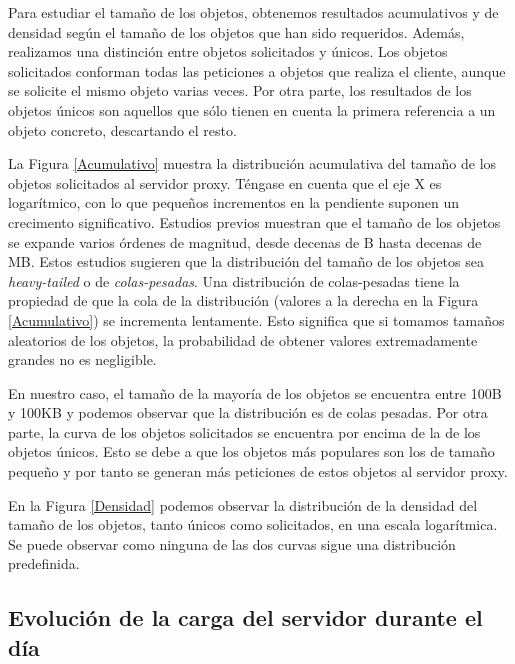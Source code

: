 \documentclass[twocolumn]{Jornadas}
\begin{document}
Para estudiar el tamaño de los objetos, obtenemos resultados acumulativos y de densidad según el tamaño de los objetos que han sido requeridos.
Además, realizamos una distinción entre objetos solicitados y únicos.
Los objetos solicitados conforman todas las peticiones a objetos que realiza el cliente, aunque se solicite el mismo objeto varias veces. Por otra parte, los resultados de los objetos únicos son aquellos que sólo tienen en cuenta la primera referencia a un objeto concreto, descartando el resto.

La Figura \ref{Acumulativo} muestra la distribución acumulativa del tamaño de los objetos solicitados al servidor proxy.
Téngase en cuenta que el eje X es logarítmico, con lo que pequeños incrementos en la pendiente suponen un crecimento significativo.
Estudios previos \cite{arlitt2}\cite{crovella} muestran que el tamaño de los objetos se expande varios órdenes de magnitud, desde decenas de B hasta decenas de MB.
Estos estudios sugieren que la distribución del tamaño de los objetos sea \emph{heavy-tailed} o de \emph{colas-pesadas}. Una distribución de colas-pesadas tiene la propiedad de que la cola de la distribución (valores a la derecha en la Figura \ref{Acumulativo}) se incrementa lentamente. Esto significa que si tomamos tamaños aleatorios de los objetos, la probabilidad de obtener valores extremadamente grandes no es negligible.


En nuestro caso, el tamaño de la mayoría de los objetos se encuentra entre 100B y 100KB y podemos observar que la distribución es de colas pesadas.
Por otra parte, la curva de los objetos solicitados se encuentra por encima de la de los objetos únicos. Esto se debe a que los objetos más populares son los de tamaño pequeño y por tanto se generan más peticiones de estos objetos al servidor proxy.

En la Figura \ref{Densidad} podemos observar la distribución de la densidad del tamaño de los objetos, tanto únicos como solicitados, en una escala logarítmica. Se puede observar como ninguna de las dos curvas sigue una distribución predefinida.

\subsection{Evolución de la carga del servidor durante el día}\label{cargaDia}
\end{document}
